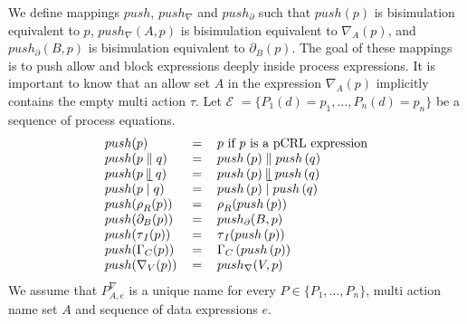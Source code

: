 \documentclass{article}
\providecommand{\leftmerge}{\mathbin{\mathrel{\llfloor}}}
\begin{document}
We define mappings $push$, $push_{\nabla }$ and $push_{\partial }$ such that 
$push(p)$ is bisimulation equivalent to $p$, $push_{\nabla }(A,p)$ is
bisimulation equivalent to $\nabla _{A}(p)$, and $push_{\partial }(B,p)$ is
bisimulation equivalent to $\partial _{B}(p)$. The goal of these mappings is
to push allow and block expressions deeply inside process expressions. It is
important to know that an allow set $A$ in the expression $\nabla _{A}(p)$
implicitly contains the empty multi action $\tau $. Let $\mathcal{E}$ $%
=\{P_{1}(d)=p_{1},\ldots ,P_{n}(d)=p_{n}\}$ be a sequence of process
equations.%
\[
\begin{tabular}{lll}
$push(p)$ & $=$ & $p$ if $p$ is a pCRL expression \\ 
$push(p\parallel q)$ & $=$ & $push\left( p\right) \parallel push\left(
q\right) $ \\ 
$push(p\leftmerge q)$ & $=$ & $push\left( p\right) \leftmerge push\left(
q\right) $ \\ 
$push(p\mid q)$ & $=$ & $push\left( p\right) \mid push\left( q\right) $ \\ 
$push(\rho _{R}(p))$ & $=$ & $\rho _{R}(push\left( p\right) )$ \\ 
$push(\partial _{B}(p))$ & $=$ & $push_{\partial }(B,p)$ \\ 
$push(\tau _{I}(p))$ & $=$ & $\tau _{I}(push\left( p\right) )$ \\ 
$push(\Gamma _{C}(p))$ & $=$ & $\Gamma _{C}\left( push\left( p\right)
\right) $ \\ 
$push(\nabla _{V}(p))$ & $=$ & $push_{\nabla }(V,p)$%
\end{tabular}%
\]%
We assume that $P_{A,e}^{\nabla }$ is a unique name for every $P\in
\{P_{1},\ldots ,P_{n}\}$, multi action name set $A$ and sequence of data
expressions $e$.%
\end{document}
